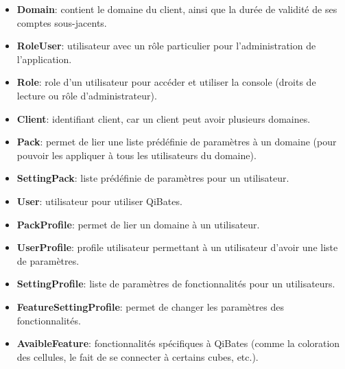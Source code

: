 \documentclass[a4paper, 11pt]{report}
\begin{document}
  \begin{itemize}
    \item \textbf{Domain}: contient le domaine du client, ainsi que la durée de validité de ses comptes sous-jacents.
    \item \textbf{RoleUser}: utilisateur avec un rôle particulier pour l'administration de l'application.
    \item \textbf{Role}: role d'un utilisateur pour accéder et utiliser la console (droits de lecture ou rôle d'administrateur).
    \item \textbf{Client}: identifiant client, car un client peut avoir plusieurs domaines.
    \item \textbf{Pack}: permet de lier une liste prédéfinie de paramètres à un domaine (pour pouvoir les appliquer à tous les utilisateurs du domaine).
    \item \textbf{SettingPack}: liste prédéfinie de paramètres pour un utilisateur.
    \item \textbf{User}: utilisateur pour utiliser QiBates.
    \item \textbf{PackProfile}: permet de lier un domaine à un utilisateur.
    \item \textbf{UserProfile}: profile utilisateur permettant à un utilisateur d'avoir une liste de paramètres.
    \item \textbf{SettingProfile}: liste de paramètres de fonctionnalités pour un utilisateurs.
    \item \textbf{FeatureSettingProfile}: permet de changer les paramètres des fonctionnalités.
    \item \textbf{AvaibleFeature}: fonctionnalités spécifiques à QiBates (comme la coloration des cellules, le fait de se connecter à certains cubes, etc.).
  \end{itemize}
\end{document}
